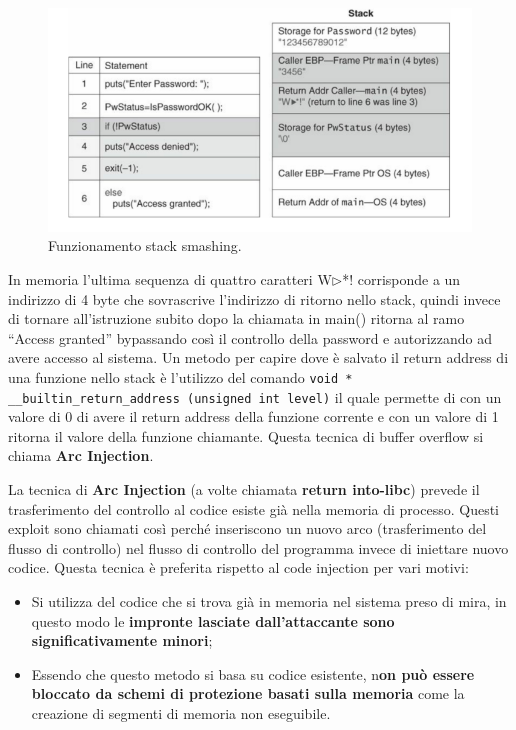 \begin{figure}[H]
	\centering
    \includegraphics[width=14cm, keepaspectratio]{santini/img/cap_2/es_pass_ok_new.png}
	\caption{Funzionamento stack smashing.}\label{fig:es_pass_ok_new}
\end{figure}
In memoria l'ultima sequenza di quattro caratteri W$\triangleright$*! corrisponde a un indirizzo di 4 byte che sovrascrive l'indirizzo di ritorno nello stack, quindi invece di tornare all'istruzione subito dopo la chiamata in main() ritorna al ramo “Access granted” bypassando così il controllo della password e autorizzando ad avere accesso al sistema.
Un metodo per capire dove è salvato il return address di una funzione nello stack è l'utilizzo del comando 
\verb|void * __builtin_return_address (unsigned int level)| il quale permette di con un valore di 0 di avere il return address della funzione corrente e con un valore di 1 ritorna il valore della funzione chiamante. Questa tecnica di buffer overflow si chiama \textbf{Arc Injection}.


La tecnica di \textbf{Arc Injection} (a volte chiamata \textbf{return into-libc}) prevede il trasferimento del controllo al codice esiste già nella memoria di processo. 
Questi exploit sono chiamati così perché inseriscono un nuovo arco (trasferimento del flusso di controllo) nel flusso di controllo del programma invece di iniettare nuovo codice. Questa tecnica è preferita rispetto al code injection per vari motivi:
\begin{itemize}
    \item Si utilizza del codice che si trova già in memoria nel sistema preso di mira, in questo modo le \textbf{impronte lasciate dall'attaccante sono significativamente minori};
    \item Essendo che questo metodo si basa su codice esistente, n\textbf{on può essere bloccato da schemi di protezione basati sulla memoria} come la creazione di segmenti di memoria non eseguibile.
\end{itemize}

